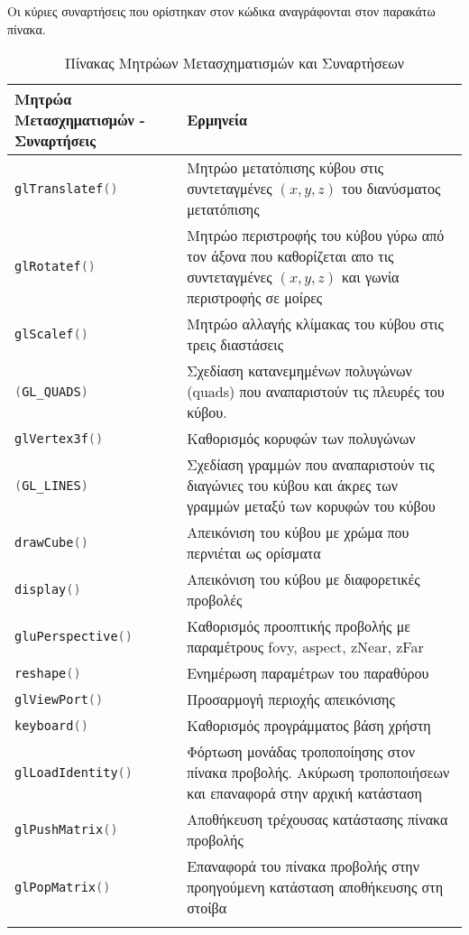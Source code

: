 \vspace{3em}
Οι κύριες συναρτήσεις που ορίστηκαν στον κώδικα αναγράφονται στον παρακάτω πίνακα. 
\vspace{3em}
\begin{longtable}{p{6cm}|p{7cm}} 
    \textbf{Μητρώα Μετασχηματισμών - Συναρτήσεις} & \textbf{Ερμηνεία} \\ \hline
    \textlatin{\lstinline[language=C++]!glTranslatef()!} & Μητρώο μετατόπισης κύβου στις συντεταγμένες $(x,y,z)$ του διανύσματος μετατόπισης \\ \hline
    \textlatin{\lstinline[language=C++]!glRotatef()!} & Μητρώο περιστροφής του κύβου γύρω από τον άξονα που καθορίζεται απο τις συντεταγμένες $(x,y,z)$ και γωνία περιστροφής σε μοίρες \\ \hline
    \textlatin{\lstinline[language=C++]!glScalef()!}  & Μητρώο αλλαγής κλίμακας του κύβου στις τρεις διαστάσεις \\ \hline
    \textlatin{\lstinline[language=C++]!(GL_QUADS)!} & Σχεδίαση κατανεμημένων πολυγώνων (quads) που αναπαριστούν τις πλευρές του κύβου. \\ \hline
    \textlatin{\lstinline[language=C++]!glVertex3f()!} & Καθορισμός κορυφών των πολυγώνων \\ \hline
    \textlatin{\lstinline[language=C++]!(GL_LINES)!} & Σχεδίαση γραμμών που αναπαριστούν τις διαγώνιες του κύβου και άκρες των γραμμών μεταξύ των κορυφών του κύβου \\ \hline
    \textlatin{\lstinline[language=C++]!drawCube()!} & Απεικόνιση του κύβου με χρώμα που περνιέται ως ορίσματα\\ \hline
    \textlatin{\lstinline[language=C++]!display()!} & Απεικόνιση του κύβου με διαφορετικές προβολές\\ \hline
    \textlatin{\lstinline[language=C++]!gluPerspective()!} & Καθορισμός προοπτικής προβολής με παραμέτρους fovy, aspect, zNear, zFar\\ \hline
    \textlatin{\lstinline[language=C++]!reshape()!} & Ενημέρωση παραμέτρων του παραθύρου \\ \hline
    \textlatin{\lstinline[language=C++]!glViewPort()!} & Προσαρμογή περιοχής απεικόνισης \\ \hline
    \textlatin{\lstinline[language=C++]!keyboard()!} & Καθορισμός προγράμματος βάση χρήστη \\ \hline
    \textlatin{\lstinline[language=C++]!glLoadIdentity()!} & Φόρτωση μονάδας τροποποίησης στον πίνακα προβολής. Ακύρωση τροποποιήσεων και επαναφορά στην αρχική κατάσταση\\ \hline
    \textlatin{\lstinline[language=C++]!glPushMatrix()!} & Αποθήκευση τρέχουσας κατάστασης πίνακα προβολής \\ \hline
    \textlatin{\lstinline[language=C++]!glPopMatrix()!} & Επαναφορά του πίνακα προβολής στην προηγούμενη κατάσταση αποθήκευσης στη στοίβα\\ \hline
    \caption{Πίνακας Mητρώων Μετασχηματισμών και Συναρτήσεων}
\end{longtable}



